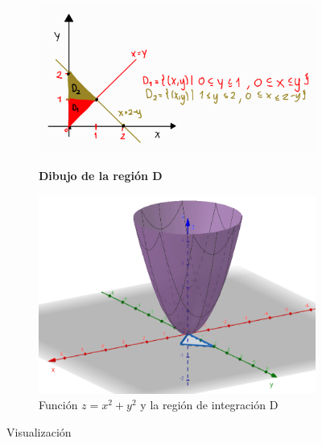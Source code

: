 \documentclass[12pt]{exam}
\begin{document}
\begin{questions}
  \begin{figure}[H]
    \centering
    \begin{subfigure}[b]{0.4\textwidth}
       \centering
      \includegraphics[width=1.5\textwidth]{./img/i1e4.png}
      \label{fig:región}
      \caption{\textbf{Dibujo de la región D}}
    \end{subfigure}
    \hfill
    \begin{subfigure}[b]{0.4\textwidth}
        \centering
        \includegraphics[width=\textwidth]{./img/i2e4.png}
        \caption{Función $z=x^2+y^2$ y la región de integración D}
        \label{fig:mapa2}
    \end{subfigure}
  \caption{Visualización }
  \end{figure}
  

\end{questions}
\end{document}
